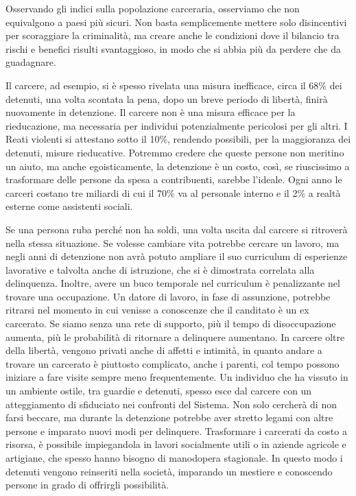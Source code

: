 \documentclass[12pt]{book} %
\begin{document}
Osservando gli indici sulla popolazione carceraria, osserviamo che non equivalgono a paesi più sicuri. Non basta semplicemente mettere solo disincentivi per scoraggiare la criminalità, ma creare anche le condizioni dove il bilancio tra rischi e benefici risulti svantaggioso, in modo che si abbia più da perdere che da guadagnare.

Il carcere, ad esempio, si è spesso rivelata una misura inefficace, circa il 68\% dei detenuti, una volta scontata la pena, dopo un breve periodo di libertà, finirà nuovamente in detenzione. Il carcere non è una misura efficace per la rieducazione, ma necessaria per individui potenzialmente pericolosi per gli altri.
I Reati violenti si attestano sotto il 10\%, rendendo possibili, per la maggioranza dei detenuti, misure rieducative.
Potremmo credere che queste persone non meritino un aiuto, ma anche egoisticamente, la detenzione è un costo, così, se riuscissimo a trasformare delle persone da spesa a contribuenti, sarebbe l'ideale. Ogni anno le carceri costano tre miliardi di cui il 70\% va al personale interno e il 2\% a realtà esterne come assistenti sociali. 

Se una persona ruba perché non ha soldi, una volta uscita dal carcere si ritroverà nella stessa situazione.
Se volesse cambiare vita potrebbe cercare un lavoro, ma negli anni di detenzione non avrà potuto ampliare il suo curriculum di esperienze lavorative e talvolta anche di istruzione, che si è dimostrata correlata alla delinquenza. Inoltre, avere un buco temporale nel curriculum è penalizzante nel trovare una occupazione. Un datore di lavoro, in fase di assunzione, potrebbe ritrarsi nel momento in cui venisse a conoscenze che il canditato è un ex carcerato.
Se siamo senza una rete di supporto, più il tempo di disoccupazione aumenta, più le probabilità di ritornare a delinquere aumentano.
In carcere oltre della libertà, vengono privati anche di affetti e intimità, in quanto andare a trovare un carcerato è piuttosto complicato, anche i parenti, col tempo possono iniziare a fare visite sempre meno frequentemente. 
Un individuo che ha vissuto in un ambiente ostile, tra guardie e detenuti, spesso esce dal carcere con un atteggiamento di sfiduciato nei confronti del Sistema. Non solo cercherà di non farsi beccare, ma durante la detenzione potrebbe aver stretto legami con altre persone e imparato nuovi modi per delinquere.
Trasformare i carcerati da costo a risorsa, è possibile impiegandola in lavori socialmente utili o in aziende agricole e artigiane, che spesso hanno bisogno di manodopera stagionale. In questo modo i detenuti vengono reinseriti nella società, imparando un mestiere e conoscendo persone in grado di offrirgli possibilità.
\end{document}

